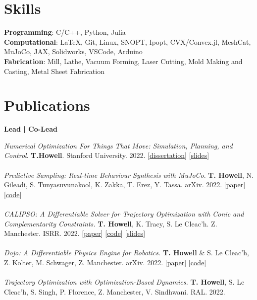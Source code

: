 \documentclass[10pt]{article}
\begin{document}
\section*{Skills}
\textbf{Programming}: {\color{lightgray} C/C++, Python, Julia}
\\
\textbf{Computational}: {\color{lightgray} \LaTeX, Git, Linux, SNOPT, Ipopt, CVX/Convex.jl, MeshCat, MuJoCo, JAX, Solidworks, VSCode, Arduino}
\\
\textbf{Fabrication}: {\color{lightgray} Mill, Lathe, Vacuum Forming, Laser Cutting, Mold Making and Casting, Metal Sheet Fabrication}

\section*{Publications}
\begin{center} \textbf{Lead | Co-Lead} \end{center}
\textit{Numerical Optimization For Things That Move: Simulation, Planning, and Control}. \textbf{T.Howell}. {\color{lightgray} Stanford University. 2022.}
[\href{https://github.com/thowell/thesis/blob/main/main.pdf}{dissertation}]
[\href{https://docs.google.com/presentation/d/1ypalKNcd1hAI59Fur3mFP5FYANqrQ1Smk2gUb-UiBIA/edit?usp=sharing}{slides}]
\\
\\
\textit{Predictive Sampling: Real-time Behaviour Synthesis with MuJoCo}. \textbf{T. Howell}{\color{lightgray}, N. Gileadi, S. Tunyasuvunakool, K. Zakka, T. Erez, Y. Tassa. arXiv. 2022.}
[\href{https://arxiv.org/abs/2212.00541}{paper}]
[\href{https://github.com/deepmind/mujoco_mpc}{code}]
\\
\\
\textit{CALIPSO: A Differentiable Solver for Trajectory Optimization with Conic and Complementarity Constraints.} \textbf{T. Howell}{\color{lightgray}, K. Tracy, S. Le Cleac'h. Z. Manchester. ISRR. 2022.}
[\href{https://arxiv.org/abs/2205.09255}{paper}]
[\href{https://github.com/thowell/CALIPSO.jl}{code}]
[\href{https://slides.com/taylorhowell/calipso}{slides}]
\\
\\
\textit{Dojo: A Differentiable Physics Engine for Robotics.} \textbf{T. Howell} {\color{lightgray}\& S. Le Cleac'h, Z. Kolter, M. Schwager, Z. Manchester. arXiv. 2022.}
[\href{https://arxiv.org/abs/2203.00806}{paper}]
[\href{https://github.com/dojo-sim}{code}]
\\
\\
\textit{Trajectory Optimization with Optimization-Based Dynamics.} \textbf{T. Howell}{\color{lightgray}, S. Le Cleac'h, S. Singh, P. Florence, Z. Manchester, V. Sindhwani. RAL. 2022.}
\end{document}

